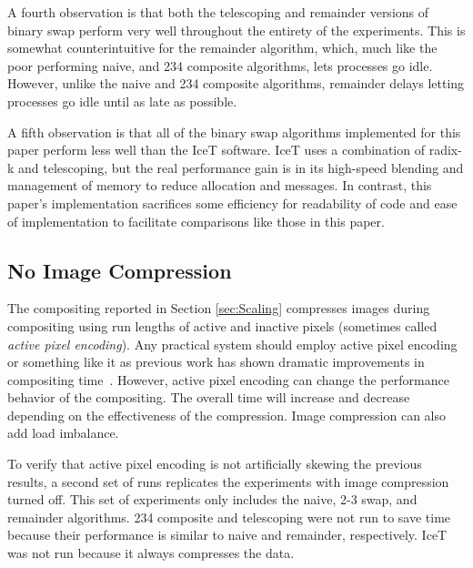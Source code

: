 \documentclass{vgtc}                          %
\newcommand*{\lcite}[1]{~\cite{#1}}
\newcommand*{\keyterm}[1]{\emph{#1}}
\newcommand*{\textalgorithm}[1]{\textsf{#1}\xspace}
\newcommand{\binaryswap}{\textalgorithm{binary swap}}
\newcommand{\ttswap}{\textalgorithm{2-3 swap}}
\newcommand{\naive}{\textalgorithm{naive}}
\newcommand{\telescoping}{\textalgorithm{telescoping}}
\newcommand{\remainder}{\textalgorithm{remainder}}
\newcommand{\ttfcomposite}{\textalgorithm{234 composite}}
\newcommand{\Ttfcomposite}{\textalgorithm{234 composite}}
\newcommand{\radixk}{\textalgorithm{radix-k}}
\begin{document}
A fourth observation is that both the \telescoping and \remainder versions of binary swap perform very well throughout the entirety of the experiments.
This is somewhat counterintuitive for the \remainder algorithm, which, much like the poor performing \naive, and \ttfcomposite algorithms, lets processes go idle.
However, unlike the \naive and \ttfcomposite algorithms, \remainder delays letting processes go idle until as late as possible.

A fifth observation is that all of the \binaryswap algorithms implemented for this paper perform less well than the IceT software.
IceT uses a combination of \radixk and \telescoping, but the real performance gain is in its high-speed blending and management of memory to reduce allocation and messages.
In contrast, this paper's implementation sacrifices some efficiency for readability of code and ease of implementation to facilitate comparisons like those in this paper.

\subsection{No Image Compression}
\label{sec:FullImages}

The compositing reported in Section \ref{sec:Scaling} compresses images during compositing using run lengths of active and inactive pixels (sometimes called \keyterm{active pixel encoding}).
Any practical system should employ active pixel encoding or something like it as previous work has shown dramatic improvements in compositing time\lcite{Ahrens1998,Yang1999,Moreland2001,Takeuchi2003}.
However, active pixel encoding can change the performance behavior of the compositing.
The overall time will increase and decrease depending on the effectiveness of the compression.
Image compression can also add load imbalance.

To verify that active pixel encoding is not artificially skewing the previous results, a second set of runs replicates the experiments with image compression turned off.
This set of experiments only includes the \naive, \ttswap, and \remainder algorithms.
\Ttfcomposite and \telescoping were not run to save time because their performance is similar to \naive and \remainder, respectively.
IceT was not run because it always compresses the data.
\end{document}
